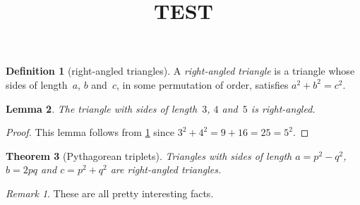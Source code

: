 
% 
    \newtheorem{theorem}{Theorem}
    \newtheorem{corollary}[theorem]{Corollary}
    \newtheorem{lemma}[theorem]{Lemma}
    \theoremstyle{definition}
    \newtheorem{definition}[theorem]{Definition}
    \theoremstyle{remark}
    \newtheorem{remark}{Remark}

    \title{TEST}

    \begin{definition}[right-angled triangles] \label{def:tri}
    A \emph{right-angled triangle} is a triangle whose sides of length~\(a\), \(b\) and~\(c\), in some permutation of order, satisfies \(a^2+b^2=c^2\).
    \end{definition}

    \begin{lemma}
    The triangle with sides of length~\(3\), \(4\) and~\(5\) is right-angled.
    \end{lemma}

    \begin{proof}
    This lemma follows from \cref{def:tri} since \(3^2+4^2=9+16=25=5^2\).
    \end{proof}

    \begin{theorem}[Pythagorean triplets] \label{thm:py}
    Triangles with sides of length \(a=p^2-q^2\), \(b=2pq\) and \(c=p^2+q^2\) are right-angled triangles.
    \end{theorem}

    \begin{remark}
    These are all pretty interesting facts.
    \end{remark}



% 
